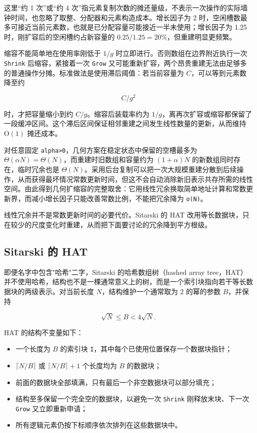\documentclass[UTF8,11pt,a4paper]{ctexart}
\begin{document}
这里“约 1 次”或“约 4 次”指元素复制次数的摊还量级，不表示一次操作的实际墙钟时间，也忽略了取整、分配器和元素构造成本。增长因子为 2 时，空闲槽数最多可接近当前元素数，也就是已分配容量可能接近一半未使用；增长因子为 1.25 时，刚扩容后的空闲槽约占新容量的 $0.25/1.25=20\%$，但重建明显更频繁。\par

缩容不能简单地在使用率刚低于 $1/g$ 时立即进行。否则数组在边界附近执行一次 \textnormal{\texttt{Shrink}} 后缩容，紧接着一次 \textnormal{\texttt{Grow}} 又可能重新扩容，两个昂贵重建无法由足够多的普通操作分摊。标准做法是使用滞后阈值：若当前容量为 $C$，可以等到元素数降至约\par

\[
  C/g^2
\]

时，才把容量缩小到约 $C/g$。缩容后装载率约为 $1/g$，离再次扩容或缩容都保留了一段缓冲区间。这个滞后区间保证相邻重建之间发生线性数量的更新，从而维持 $\mathrm{O}(1)$ 摊还成本。\par

对任意固定 \textnormal{\texttt{alpha>0}}，几何方案在稳定状态中保留的空槽最多为 $\Theta(\alpha N)=\Theta(N)$，而重建时旧数组和容量约为 $(1+\alpha)N$ 的新数组同时存在，临时冗余也是 $\Theta(N)$。采用后台复制可以把一次大规模重建分散到后续操作，从而获得最坏情况常数更新时间，但这不会自动消除新旧表示共存所需的线性空间。由此得到几何扩缩容的完整取舍：它用线性冗余换取简单地址计算和常数更新界，而减小增长因子只能改善常数比例，不能把冗余降为 \textnormal{\texttt{o(N)}}。\par

线性冗余并不是常数更新时间的必要代价。Sitarski 的 HAT 改用等长数据块，只在较少的尺度变化时重建，从而把下面要讨论的冗余降到平方根级。\par

\subsection{Sitarski 的 HAT}

即便名字中包含"哈希"二字，Sitarski 的哈希数组树（hashed array tree，HAT）并不使用哈希，结构也不是一棵通常意义上的树，而是一个索引块指向若干等长数据块的两级表示。对当前长度 $N$，结构维护一个通常取为 2 的幂的参数 $B$，并保持\par

\[
  \sqrt{N} \leq B < 4\sqrt{N}.
\]

HAT 的结构不变量如下：\par

\begin{itemize}
\item 一个长度为 $B$ 的索引块 \textnormal{\texttt{I}}，其中每个已使用位置保存一个数据块指针；
\item $\lceil N/B\rceil$ 或 $\lceil N/B\rceil+1$ 个长度均为 $B$ 的数据块；
\item 前面的数据块全部填满，只有最后一个非空数据块可以部分填充；
\item 结构至多保留一个完全空的数据块，以避免一次 \textnormal{\texttt{Shrink}} 刚释放末块、下一次 \textnormal{\texttt{Grow}} 又立即重新申请；
\item 所有逻辑元素仍按下标顺序依次排列在这些数据块中。
\end{itemize}
\end{document}
